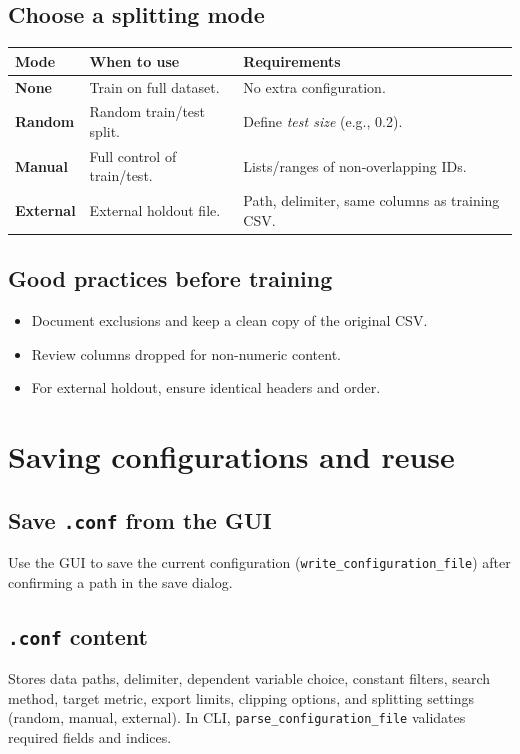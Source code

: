 \documentclass[12pt,a4paper]{article}
\begin{document}
\subsection{Choose a splitting mode}
\begin{center}
\begin{tabularx}{\linewidth}{@{}>{\bfseries}l X X@{}}
\toprule
Mode & When to use & Requirements \\
\midrule
None & Train on full dataset. & No extra configuration.\\
Random & Random train/test split. & Define \emph{test size} (e.g., 0.2).\\
Manual & Full control of train/test. & Lists/ranges of non-overlapping IDs.\\
External & External holdout file. & Path, delimiter, same columns as training CSV.\\
\bottomrule
\end{tabularx}
\end{center}

\subsection{Good practices before training}
\begin{itemize}
  \item Document exclusions and keep a clean copy of the original CSV.
  \item Review columns dropped for non-numeric content.
  \item For external holdout, ensure identical headers and order.
\end{itemize}

\section{Saving configurations and reuse}
\subsection{Save \texttt{.conf} from the GUI}
Use the GUI to save the current configuration (\texttt{write\_configuration\_file}) after confirming a path in the save dialog.

\subsection{\texttt{.conf} content}
Stores data paths, delimiter, dependent variable choice, constant filters, search method, target metric, export limits, clipping options, and splitting settings (random, manual, external). In CLI, \texttt{parse\_configuration\_file} validates required fields and indices.
\end{document}
